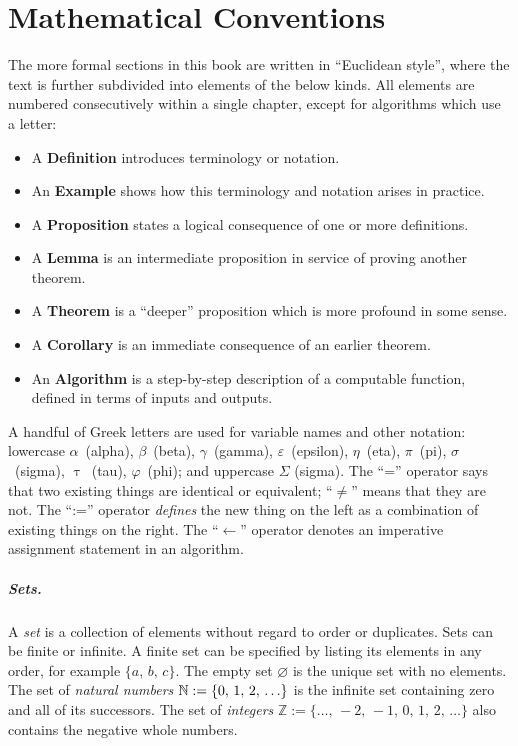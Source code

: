 \documentclass[../generics]{subfiles}
\begin{document}
\chapter{Mathematical Conventions}\label{math summary}

The more formal sections in this book are written in ``Euclidean style'', where the text is further subdivided into elements of the below kinds. All elements are numbered consecutively within a single chapter, except for algorithms which use a letter:
\begin{itemize}
\item A \textbf{Definition} introduces terminology or notation.
\item An \textbf{Example} shows how this terminology and notation arises in practice.
\item A \textbf{Proposition} states a logical consequence of one or more definitions.
\item A \textbf{Lemma} is an  intermediate proposition in service of proving another theorem.
\item A \textbf{Theorem} is a ``deeper'' proposition which is more profound in some sense.
\item A \textbf{Corollary} is an immediate consequence of an earlier theorem.
\item An \textbf{Algorithm} is a step-by-step description of a computable function, defined in terms of inputs and outputs.
\end{itemize}

A handful of Greek letters are used for variable names and other notation: lowercase $\alpha$~(alpha), $\beta$~(beta), $\gamma$~(gamma), $\varepsilon$~(epsilon), $\eta$~(eta), $\pi$~(pi), $\sigma$~(sigma), $\uptau$~(tau), $\varphi$~(phi); and uppercase $\Sigma$ (sigma). The ``='' operator says that two existing things are identical or equivalent; ``$\neq$'' means that they are not. The ``:='' operator \emph{defines} the new thing on the left as a combination of existing things on the right. The ``$\leftarrow$'' operator denotes an imperative assignment statement in an algorithm.

\paragraph{Sets.}
A \emph{set} is a collection of elements without regard to order or duplicates. Sets can be finite or infinite. A finite set can be specified by listing its elements in any order, for example $\{a,\,b,\,c\}$. The empty set \index{$\varnothing$}$\varnothing$ is the unique set with no elements. The set of \emph{natural numbers} \index{$\NN$}$\mathbb{N}:=\{0,\,1,\,2,\,\ldots\}$ is the infinite set containing zero and all of its successors. The set of \emph{integers} $\mathbb{Z}:=\{\ldots,\,-2,\,-1,\,0,\,1,\,2,\,\ldots\}$ also contains the negative whole numbers.
\end{document}
